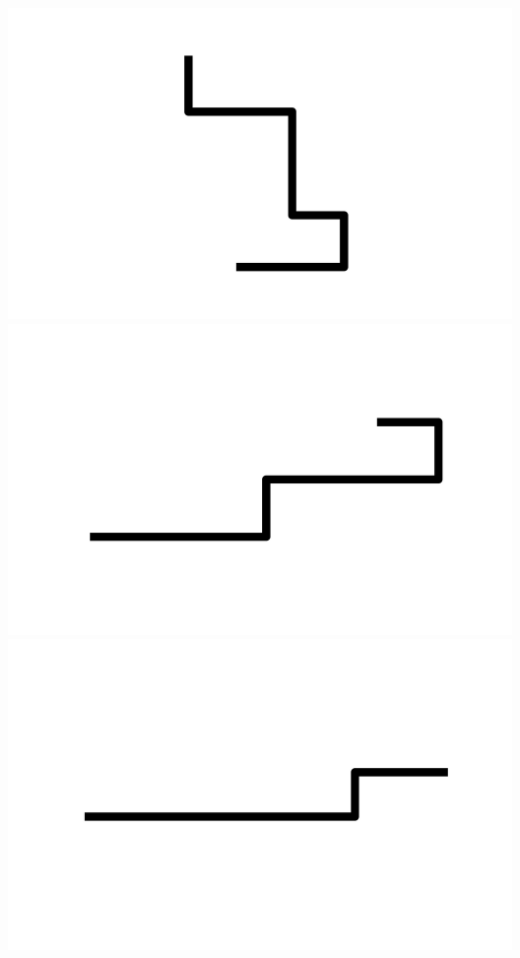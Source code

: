\documentclass[]{report}
\begin{document}
\includegraphics[scale=.1]{pictures/21/state_cluster_shapes_70.pdf} 
\includegraphics[scale=.1]{pictures/21/state_cluster_shapes_71.pdf} 
\includegraphics[scale=.1]{pictures/21/state_cluster_shapes_72.pdf} 
\end{document}
